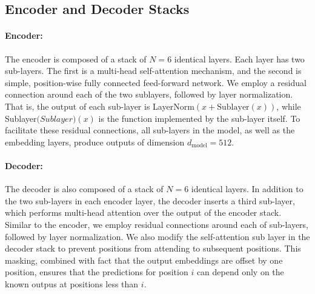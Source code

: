 \documentclass{article}
\begin{document}
\subsection{Encoder and Decoder Stacks}
\paragraph{Encoder:}The encoder is composed of a stack of $N=6$ identical layers. Each layer has two sub-layers. The first is a multi-head self-attention mechanism, and the second is simple, position-wise fully connected feed-forward network.
We employ a residual connection\cite{11} around each of the two sublayers, followed by layer normalization\cite{1}.
That is, the output of each sub-layer is LayerNorm$\left(x+\mathrm{Sublayer}\left(x\right)\right)$, while Sublayer$\mathrm(Sublayer)\left(x\right)$ is the function implemented by the sub-layer itself.
To facilitate these residual connections, all sub-layers in the model, as well as the embedding layers, produce outputs of dimension $d_\mathrm{model}=512$.

\paragraph{Decoder:} The decoder is also composed of a stack of $N=6$ identical layers. In addition to the two sub-layers in each encoder layer, the decoder inserts a third sub-layer, which performs multi-head attention over the output of the encoder stack.
Similar to the encoder, we employ residual connections around each of sub-layers, followed by layer normalization.
We also modify the self-attention sub layer in the decoder stack to prevent positions from attending to subsequent positions.
This masking, combined with fact that the output embeddings are offset by one position, ensures that the predictions for position $i$ can depend only on the known outpus at positions less than $i$.
\end{document}
